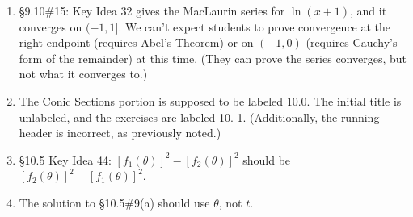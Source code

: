 \documentclass{amsart}
\begin{document}
\begin{enumerate}
\item \S9.10\#15: Key Idea 32 gives the MacLaurin series for $\ln(x+1)$, and it converges on $(-1,1]$.  We can't expect students to prove convergence at the right endpoint (requires Abel's Theorem) or on $(-1,0)$ (requires Cauchy's form of the remainder) at this time.  (They can prove the series converges, but not what it converges to.)
\item The Conic Sections portion is supposed to be labeled 10.0.  The initial title is unlabeled, and the exercises are labeled 10.-1.  (Additionally, the running header is incorrect, as previously noted.)
\item \S10.5 Key Idea 44: $[f_1(\theta)]^2 - [f_2(\theta)]^2$ should be $[f_2(\theta)]^2 - [f_1(\theta)]^2$.
\item The solution to \S10.5\#9(a) should use $\theta$, not $t$.
\label{2017-01-00IIplus}
\end{enumerate}

\clearpage
\end{document}
